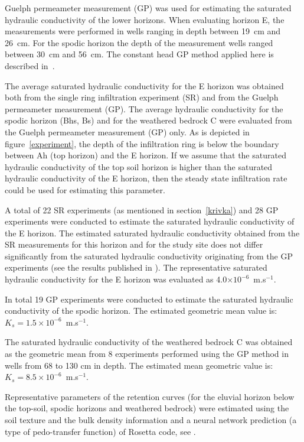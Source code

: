 \documentclass[review]{myarticle}
\begin{document}
Guelph permeameter measurement (GP) was used for estimating the saturated hydraulic conductivity of the lower horizons. When evaluating horizon E, the measurements were performed in wells ranging in depth between 19~cm  and 26~cm. For the spodic horizon the depth of the measurement wells ranged between 30~cm  and 56~cm. The constant head GP method applied here is described in~\citep{Jacka1}.



The average saturated hydraulic conductivity for the E horizon was obtained both from the single ring infiltration experiment (SR) and from the Guelph permeameter measurement (GP). The average hydraulic conductivity for the spodic horizon (Bhs, Bs) and for the weathered bedrock C were evaluated from the Guelph permeameter measurement (GP) only.
As is depicted in figure~\ref{experiment}, the depth of the infiltration ring is below the boundary between Ah (top horizon) and the E horizon. If we assume that the saturated hydraulic conductivity of the top soil horizon is higher than the saturated hydraulic conductivity of the E horizon, then the steady state infiltration rate could be used for estimating this parameter.



A total of 22 SR experiments (as mentioned in section~\ref{krivka}) and 28 GP experiments were conducted to estimate the saturated hydraulic conductivity of the E horizon. The estimated saturated hydraulic conductivity obtained from the SR measurements for this horizon and for the study site does not differ significantly from the saturated hydraulic conductivity originating from the GP experiments (see the results published in \citep{Jacka1}).
 The representative saturated hydraulic conductivity for the E horizon was evaluated as 4.0$\times 10^{-6}$~m.s$^{-1}$.


In total 19 GP experiments were conducted to estimate the saturated hydraulic conductivity of the spodic horizon. The estimated geometric mean value is: $K_s =  1.5\times 10^{-6}$~m.s$^{-1}$.

The saturated hydraulic conductivity of the weathered
    bedrock C was obtained as the geometric mean  from 8 experiments performed using the GP method  in wells from 68 to 130 cm in depth. The estimated mean geometric value is: $K_s =  8.5\times 10^{-6}$~m.s$^{-1}$.

Representative parameters of the retention curves (for the eluvial horizon below the top-soil, spodic horizons and weathered bedrock) were estimated using the soil texture and the bulk density information and a neural network prediction (a type of pedo-transfer function) of Rosetta code, see \citep{Schaap}. 
\end{document}
